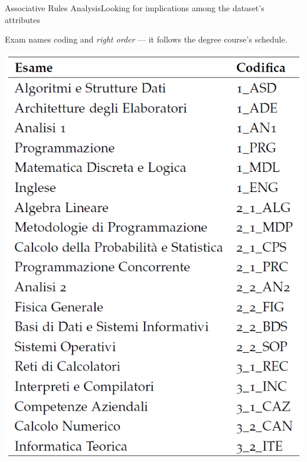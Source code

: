 \begin{frame}{Associative Rules Analysis}{Looking for implications among the dataset's attributes}

	\vspace{0.3cm}
	Exam names coding and \emph{right order} \tiny{--- it follows the degree course's schedule.}

    \vspace{0.3cm}
    \begin{centering}
        \hspace*{3.0cm}\includegraphics[scale=0.20]{seq1.png}
    \end{centering}

\end{frame}

